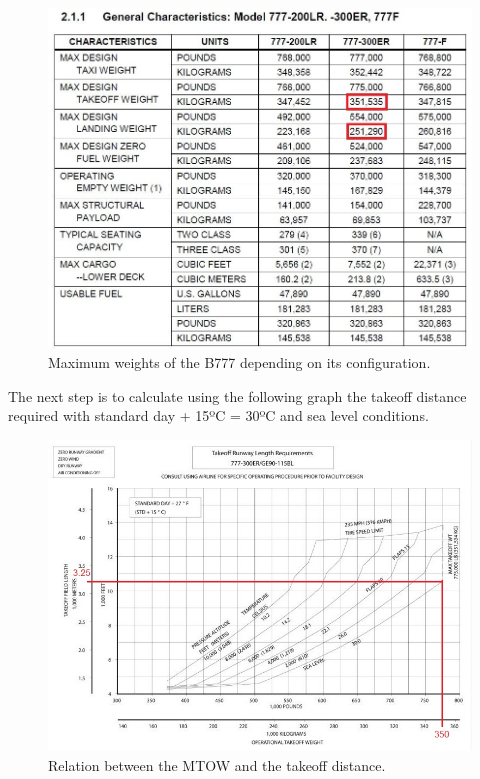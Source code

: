 			\begin{figure}[H]
				\centering
				\includegraphics[clip, trim=0cm 0cm 0cm 0cm, width=1\textwidth]{./images/B777/B777MTOW}
				\caption{Maximum weights of the B777 depending on its configuration.} %
				\label{} %
			\end{figure}

			The next step is to calculate using the following graph the takeoff distance required with standard day + 15ºC = 30ºC and sea level conditions.
			
			\begin{figure}[H]
				\centering
				\includegraphics[clip, trim=0cm 0cm 0cm 0cm, width=1\textwidth]{./images/B777/payload-takeoffdistance}
				\caption{Relation between the MTOW and the takeoff distance.} %
				\label{} %
			\end{figure}
			

